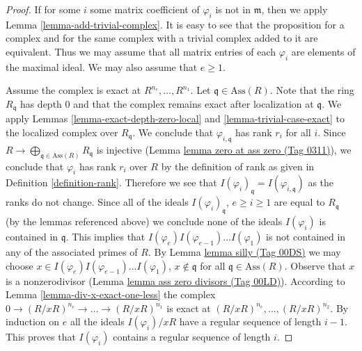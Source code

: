\documentclass{amsart}
\theoremstyle{plain}
\theoremstyle{definition}
\theoremstyle{remark}
\numberwithin{equation}{subsection}
\begin{document}
\begin{proof}
If for some $i$ some matrix coefficient of $\varphi_i$
is not in $\mathfrak m$, then we apply Lemma \ref{lemma-add-trivial-complex}.
It is easy to see that the proposition for a complex and
for the same complex with a trivial complex added to it
are equivalent. Thus we may assume that all matrix entries
of each $\varphi_i$ are elements of the maximal ideal.
We may also assume that $e \geq 1$.

\medskip\noindent
Assume the complex is exact at $R^{n_e}, \ldots, R^{n_1}$.
Let $\mathfrak q \in \text{Ass}(R)$.
Note that the ring $R_{\mathfrak q}$ has depth $0$
and that the complex remains exact after localization at $\mathfrak q$.
We apply Lemmas \ref{lemma-exact-depth-zero-local} and
\ref{lemma-trivial-case-exact} to the localized complex
over $R_{\mathfrak q}$. We conclude that
$\varphi_{i, \mathfrak q}$ has rank $r_i$ for all $i$.
Since $R \to \bigoplus_{\mathfrak q \in \text{Ass}(R)} R_\mathfrak q$
is injective (Lemma \href{https://stacks.math.columbia.edu/tag/0311}{lemma zero at ass zero (Tag 0311)}), we conclude that
$\varphi_i$ has rank $r_i$ over $R$ by the definition of rank as given
in Definition \ref{definition-rank}. Therefore we see that
$I(\varphi_i)_\mathfrak q = I(\varphi_{i, \mathfrak q})$
as the ranks do not change. Since all of the ideals
$I(\varphi_i)_{\mathfrak q}$, $e \geq i \geq 1$
are equal to $R_{\mathfrak q}$ (by the lemmas referenced above)
we conclude none of the ideals $I(\varphi_i)$ is contained in $\mathfrak q$.
This implies that $I(\varphi_e)I(\varphi_{e-1})\ldots I(\varphi_1)$
is not contained in any of the associated primes
of $R$. By Lemma \href{https://stacks.math.columbia.edu/tag/00DS}{lemma silly (Tag 00DS)} we may choose
$x \in I(\varphi_e)I(\varphi_{e - 1})\ldots I(\varphi_1)$,
$x \not \in \mathfrak q$ for all $\mathfrak q \in \text{Ass}(R)$.
Observe that $x$ is a nonzerodivisor (Lemma \href{https://stacks.math.columbia.edu/tag/00LD}{lemma ass zero divisors (Tag 00LD)}).
According to Lemma \ref{lemma-div-x-exact-one-less}
the complex $0 \to (R/xR)^{n_e} \to \ldots \to (R/xR)^{n_1}$ is exact
at $(R/xR)^{n_e}, \ldots, (R/xR)^{n_2}$. By induction
on $e$ all the ideals $I(\varphi_i)/xR$ have a regular
sequence of length $i - 1$. This proves that $I(\varphi_i)$
contains a regular sequence of length $i$.


\end{proof}
\end{document}
